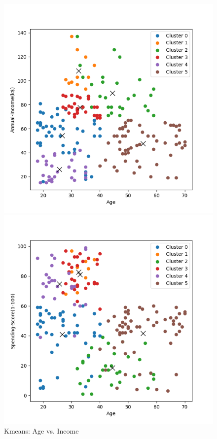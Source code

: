 \documentclass[8pt]{article}
\begin{document}
\begin{figure}[H]
    \centering
    \begin{minipage}{0.32\textwidth}
        \centering
        \includegraphics[width=\textwidth]{./Prob4/out/task1_rand14/images/cluster_result_k6_0_1.png}
        \caption{Kmeans: Age vs. Income}
        \label{fig: Age vs. Annual Income k6 com}
    \end{minipage}
    \hfill
    \begin{minipage}{0.32\textwidth}
        \centering
        \includegraphics[width=\textwidth]{./Prob4/out/task1_rand14/images/cluster_result_k6_0_2.png}

\end{minipage}
\end{figure}
\end{document}
